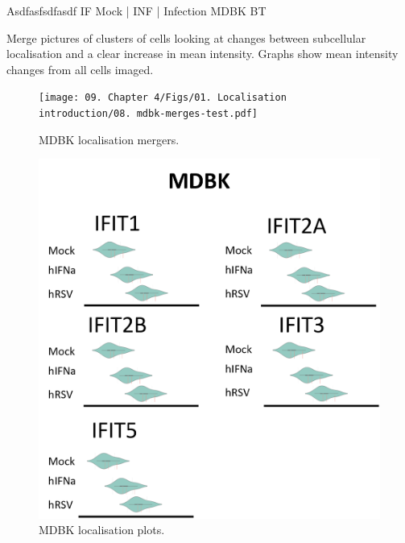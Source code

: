 Asdfasfsdfasdf \newline
IF Mock | INF | Infection \newline
MDBK BT

Merge pictures of clusters of cells looking at changes between subcellular localisation and a clear increase in mean intensity. Graphs show mean intensity changes from all cells imaged.

\begin{figure}
    \centering
    \texttt{[image: 09. Chapter 4/Figs/01. Localisation introduction/08. mdbk-merges-test.pdf]}
    \caption[MDBK localisation mergers.]{MDBK localisation mergers.}
    \label{fig:MDBK localisation mergers}
\end{figure}


\begin{figure}
    \centering
    \includegraphics[width=1\linewidth]{09. Chapter 4/Figs/01. Localisation introduction/09. mdbk plots.png}
    \caption[MDBK localisation plots.]{MDBK localisation plots.}
    \label{fig:MDBK localisation plots}
\end{figure}

